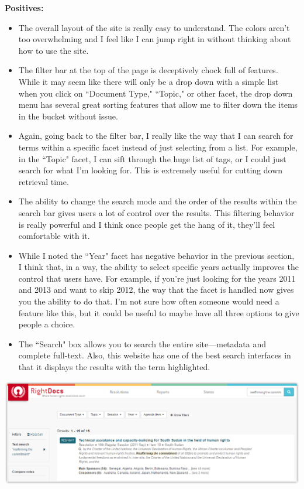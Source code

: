 \documentclass{article}
\begin{document}
    \noindent\textbf{Positives:}
    \begin{itemize}
    \itemsep0em 
        \item The overall layout of the site is really easy to understand. The colors aren't too overwhelming and I feel like I can jump right in without thinking about how to use the site.
        \item The filter bar at the top of the page is deceptively chock full of features. While it may seem like there will only be a drop down with a simple list when you click on ``Document Type," ``Topic," or other facet, the drop down menu has several great sorting features that allow me to filter down the items in the bucket without issue. 
        \item Again, going back to the filter bar, I really like the way that I can search for terms within a specific facet instead of just selecting from a list. For example, in the ``Topic" facet, I can sift through the huge list of tags, or I could just search for what I'm looking for. This is extremely useful for cutting down retrieval time. 
        \item The ability to change the search mode and the order of the results within the search bar gives users a lot of control over the results. This filtering behavior is really powerful and I think once people get the hang of it, they'll feel comfortable with it.
        \item While I noted the ``Year" facet has negative behavior in the previous section, I think that, in a way, the ability to select specific years actually improves the control that users have. For example, if you're just looking for the years 2011 and 2013 and want to skip 2012, the way that the facet is handled now gives you the ability to do that. I'm not sure how often someone would need a feature like this, but it could be useful to maybe have all three options to give people a choice.
        \item The ``Search" box allows you to search the entire site---metadata and complete full-text. Also, this website has one of the best search interfaces in that it displays the results with the term highlighted.
    \end{itemize}
    
\noindent\includegraphics[width=\textwidth]{2016-06-09-RightDocs-Search}
    
\end{document}
